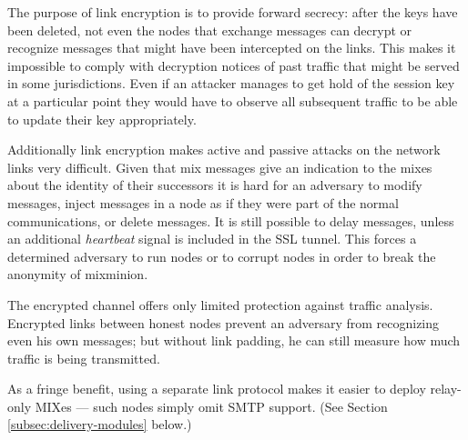 \documentclass[11pt]{IEEEtran}
\begin{document}
%

The purpose of link encryption is to provide forward secrecy: 
after the keys have been deleted, not even the
nodes that exchange messages can decrypt or recognize messages
that might have been intercepted on the links. This makes it
impossible to comply with decryption notices of past traffic 
that might be served in
some jurisdictions.  
Even if an
attacker manages to get hold of the session key at a particular point
they would have to observe all subsequent traffic to be able to update
their key appropriately.

Additionally link encryption makes active and passive attacks on the
network links very difficult. Given that mix messages give an
indication to the mixes about the identity of their successors it is
hard for an 
adversary to modify messages, inject messages in a node as if they
were part of the normal communications, or delete messages. It is
still possible to delay messages, unless an additional
\emph{heartbeat} signal is included in the SSL tunnel. This forces a
determined adversary to run nodes or to corrupt nodes in 
order to break the anonymity of mixminion.

The encrypted channel offers only limited protection against traffic
analysis. Encrypted links between honest nodes prevent an adversary
from recognizing even his own messages; but without link padding, he
can still measure how much traffic is being transmitted.

As a fringe benefit, using a separate link protocol makes it
easier to deploy relay-only MIXes --- such nodes simply omit SMTP
support.  (See Section \ref{subsec:delivery-modules} below.)
\end{document}
